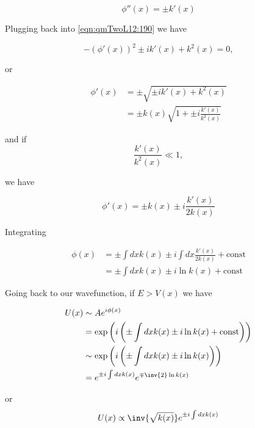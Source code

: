 \begin{equation}\label{eqn:qmTwoL12:250b}
\phi''(x) = \pm k'(x)
\end{equation}

Plugging back into \ref{eqn:qmTwoL12:190} we have

\begin{equation}\label{eqn:qmTwoL12:270}
-(\phi'(x))^2 \pm i k'(x) + k^2(x) = 0,
\end{equation}

or

\begin{equation}\label{eqn:qmTwoL12:290}
\begin{aligned}
\phi'(x) 
&= \pm \sqrt{ \pm i k'(x) + k^2(x) } \\
&= \pm k(x) \sqrt{ 1 + \pm i \frac{k'(x)}{k^2(x)} } 
\end{aligned}
\end{equation}

and if
\begin{equation}\label{eqn:qmTwoL12:310}
\frac{k'(x)}{k^2(x)} \ll 1, 
\end{equation}

we have

\begin{equation}\label{eqn:qmTwoL12:330}
\phi'(x) 
= \pm k(x) \pm i \frac{k'(x)}{2 k(x)}  
\end{equation}

Integrating

\begin{align*}
\phi(x) 
&= \pm \int dx k(x) \pm i \int dx \frac{k'(x)}{2 k(x)}  + \text{const} \\
&= \pm \int dx k(x) \pm i \ln k(x) + \text{const} 
\end{align*}

Going back to our wavefunction, if $E > V(x)$ we have

\begin{align*}
U(x) 
&\sim A e^{i \phi(x)} \\
&= \exp \left(i\left( 
\pm \int dx k(x) \pm i \ln k(x) + \text{const} 
\right)\right) \\
&\sim \exp \left(i\left( 
\pm \int dx k(x) \pm i \ln k(x) 
\right)\right) \\
&= e^{\pm i \int dx k(x)} e^{\mp \inv{2} \ln k(x)} \\
\end{align*}

or
\begin{equation}\label{eqn:qmTwoL12:350}
U(x) \propto \inv{\sqrt{k(x)}} e^{\pm i \int dx k(x)} 
\end{equation}

